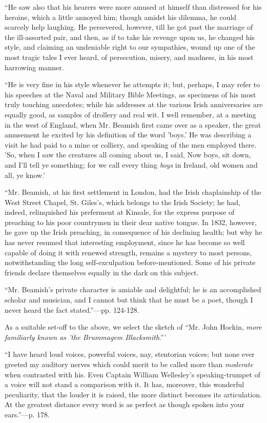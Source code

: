 ``He
saw also that his hearers were more amused at himself than distressed
for his heroine, which a little annoyed him; though amidst his dilemma,
he could scarcely help laughing. He persevered, however, till he got
past the marriage of the ill-assorted pair, and then, as if to take his
revenge upon us, he changed his style, and claiming an undeniable right
to our sympathies, wound up one of the most tragic tales I ever heard,
of persecution, misery, and madness, in his most harrowing manner.

``He
is very fine in his style whenever he attempts it; but, perhaps, I may
refer to his speeches at the Naval and Military Bible Meetings, as
specimens of his most truly touching anecdotes; while his addresses at
the various Irish anniversaries are equally good, as samples of drollery
and real wit. I well remember, at a meeting in the west of England, when
Mr. Beamish first came over as a speaker, the great amusement he excited
by his definition of the word 'boys.' He was describing a visit he had
paid to a mine or colliery, and speaking of the men employed there. 'So,
when I saw the creatures all coming about us, I said, Now boys, sit
down, and I'll tell ye something; for we call every thing \emph{boys} in
Ireland, old women and all, ye know.'

``Mr.
Beamish, at his first settlement in London, had the Irish chaplainship
of the West Street Chapel, St. Giles's, which belongs to the Irish
Society; he had, indeed, relinquished his preferment at Kinsale, for the
express purpose of preaching to his poor countrymen in their
dear
native tongue. In 1832, however, he gave up the Irish preaching, in
consequence of his declining health; but why he has never resumed that
interesting employment, since he has become so well capable of doing it
with renewed strength, remains a mystery to most persons,
notwithstanding the long self-exculpation before-mentioned. Some of his
private friends declare themselves equally in the dark on this subject.

``Mr.
Beamish's private character is amiable and delightful; he is an
accomplished scholar and musician, and I cannot but think that he must
be a poet, though I never heard the fact stated.''—pp. 124-128.

As a
suitable set-off to the above, we select the sketch of ``Mr. John Hockin,
\emph{more familiarly known as 'the Brummagem Blacksmith}.'''

``I
have heard loud voices, powerful voices, nay, stentorian voices; but
none ever greeted my auditory nerves which could merit to be called more
than \emph{moderate} when contrasted with his. Even Captain William
Wellesley's speaking-trumpet of a voice will not stand a comparison with
it. It has, moreover, this wonderful peculiarity, that the louder it is
raised, the more distinct becomes its articulation. At the greatest
distance every word is as perfect as though spoken into your ears.''—p.
178.

